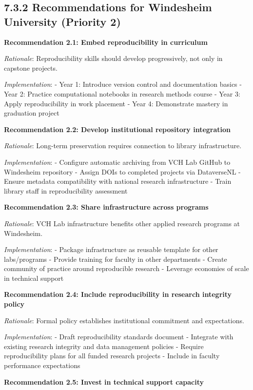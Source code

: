 \documentclass[
  oneside,
  open=any]{scrbook}
\begin{document}
\subsection{7.3.2 Recommendations for Windesheim University (Priority
2)}\label{recommendations-for-windesheim-university-priority-2}

\textbf{Recommendation 2.1: Embed reproducibility in curriculum}

\emph{Rationale}: Reproducibility skills should develop progressively,
not only in capstone projects.

\emph{Implementation}: - Year 1: Introduce version control and
documentation basics - Year 2: Practice computational notebooks in
research methods course - Year 3: Apply reproducibility in work
placement - Year 4: Demonstrate mastery in graduation project

\textbf{Recommendation 2.2: Develop institutional repository
integration}

\emph{Rationale}: Long-term preservation requires connection to library
infrastructure.

\emph{Implementation}: - Configure automatic archiving from VCH Lab
GitHub to Windesheim repository - Assign DOIs to completed projects via
DataverseNL - Ensure metadata compatibility with national research
infrastructure - Train library staff in reproducibility assessment

\textbf{Recommendation 2.3: Share infrastructure across programs}

\emph{Rationale}: VCH Lab infrastructure benefits other applied research
programs at Windesheim.

\emph{Implementation}: - Package infrastructure as reusable template for
other labs/programs - Provide training for faculty in other departments
- Create community of practice around reproducible research - Leverage
economies of scale in technical support

\textbf{Recommendation 2.4: Include reproducibility in research
integrity policy}

\emph{Rationale}: Formal policy establishes institutional commitment and
expectations.

\emph{Implementation}: - Draft reproducibility standards document -
Integrate with existing research integrity and data management policies
- Require reproducibility plans for all funded research projects -
Include in faculty performance expectations

\textbf{Recommendation 2.5: Invest in technical support capacity}
\end{document}
